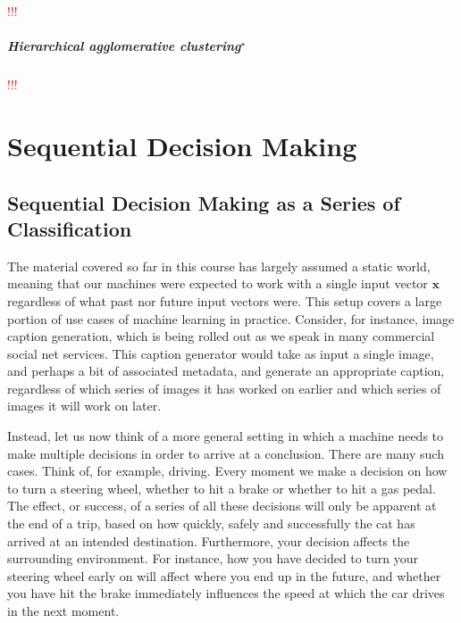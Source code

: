 \documentclass{report}
\newcommand{\vect}[1]{\mathbf{#1}}
\newcommand{\vx}[0]{\vect{x}}
\newcommand{\todo}[1]{{\Large\textcolor{red}{#1}}}
\begin{document}
\todo{!!!}

\paragraph{Hierarchical agglomerative clustering$^\star$}

\todo{!!!}


\chapter{Sequential Decision Making}

\section{Sequential Decision Making as a Series of Classification}

The material covered so far in this course has largely assumed a static world,
meaning that our machines were expected to work with a single input vector $\vx$
regardless of what past nor future input vectors were. This setup covers a large
portion of use cases of machine learning in practice. Consider, for instance,
image caption generation, which is being rolled out as we speak in many
commercial social net services. This caption generator would take as input a
single image, and perhaps a bit of associated metadata, and generate an
appropriate caption, regardless of which series of images it has worked on
earlier and which series of images it will work on later.  

Instead, let us now think of a more general setting in which a machine needs to
make multiple decisions in order to arrive at a conclusion. There are many such
cases. Think of, for example, driving. Every moment we make a decision on how to
turn a steering wheel, whether to hit a brake or whether to hit a gas pedal. The
effect, or success, of a series of all these decisions will only be apparent at
the end of a trip, based on how quickly, safely and successfully the cat has
arrived at an intended destination. Furthermore, your decision affects the
surrounding environment. For instance, how you have decided to turn your
steering wheel early on will affect where you end up in the future, and whether
you have hit the brake immediately influences the speed at which the car drives
in the next moment.
\end{document}
